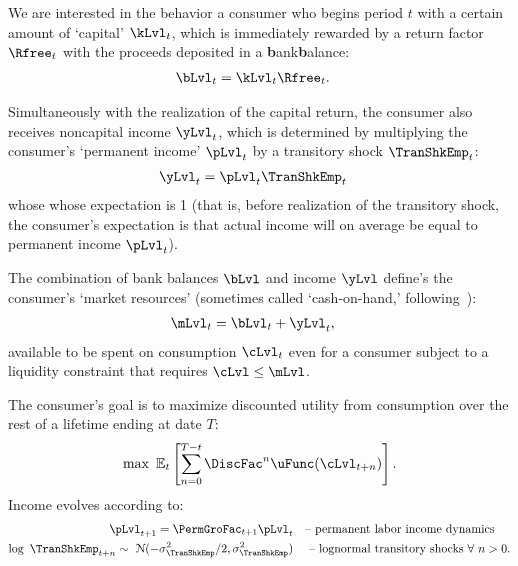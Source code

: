 \documentclass[titlepage, headings=optiontotocandhead]{Resources/texmf-local/tex/latex/econtex}
\begin{document}
We are interested in the behavior a consumer who begins {period} $t$ with a certain amount of `capital' $\kLvl_{t}$, which is immediately rewarded by a return factor $\Rfree_{t}$  with the proceeds deposited in a \textbf{b}ank\textbf{b}alance:
\begin{equation}\begin{gathered}\begin{aligned}\label{eq:bLvl}
      \bLvl_{t} & = \kLvl_{t}\Rfree_{t}. 
    \end{aligned}\end{gathered}\end{equation}

Simultaneously with the realization of the capital return, the consumer also receives noncapital income $\yLvl_{t}$, which is determined by multiplying the consumer's `permanent income' $\pLvl_{t}$ by a transitory shock $\TranShkEmp_{t}$:
\begin{equation}\begin{gathered}\begin{aligned}
      \yLvl_{t} & = \pLvl_{t}\TranShkEmp_{t} \label{eq:yLvl}
    \end{aligned}\end{gathered}\end{equation}
whose whose expectation is 1 (that is, before realization of the transitory shock, the consumer's expectation is that actual income will on average be equal to permanent income $\pLvl_{t}$).

The combination of bank balances $\bLvl$ and income $\yLvl$ define's the consumer's `market resources' (sometimes called `cash-on-hand,' following~\cite{deatonUnderstandingC}):
\begin{equation}\begin{gathered}\begin{aligned}
      \mLvl_{t} & = \bLvl_{t}+\yLvl_{t} \label{eq:mLvl},
    \end{aligned}\end{gathered}\end{equation}
available to be spent on consumption $\cLvl_{t}$ even for a consumer subject to a liquidity constraint that requires $\cLvl \leq \mLvl$.

The consumer's goal is to maximize discounted utility from consumption over the rest of a lifetime ending at date $T$:
  \begin{equation}\label{eq:MaxProb}
    \max~{\Ex}_{t}\left[\sum_{n=0}^{T-t}{\DiscFac}^{n} \uFunc({\cLvl}_{t+n})\right].
  \end{equation}
Income evolves according to: 
  \begin{equation}\begin{gathered}\begin{aligned}
        \pLvl_{t+1}  = \PermGroFac_{t+1}\pLvl_{t}  &  \text{~~ -- permanent labor income dynamics} \label{eq:permincgrow}
        \\ \log ~ \TranShkEmp_{t+n} \sim ~\mathcal{N}(-\sigma_{\TranShkEmp}^{2}/2,\sigma_{\TranShkEmp}^{2}) & \text{~~~ -- lognormal transitory shocks}~\forall~n>0 .
      \end{aligned}\end{gathered}\end{equation}
\end{document}
